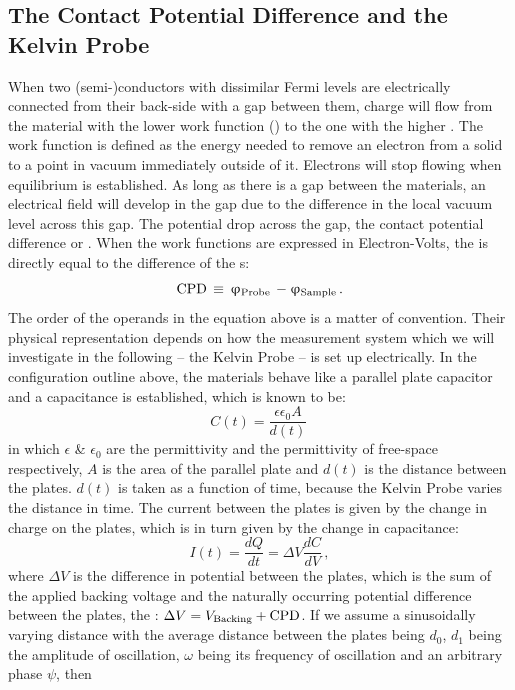 \subsection{The Contact Potential Difference and the Kelvin Probe}
When two (semi-)conductors with dissimilar Fermi levels are electrically connected from their back-side with a gap between them, charge will flow from the material with the lower work function (\wf{}) to the one with the higher \wf{}. The work function is defined as the energy needed to remove an electron from a solid to a point in vacuum immediately outside of it. Electrons will stop flowing when equilibrium is established. As long as there is a gap between the materials, an electrical field will develop in the gap due to the difference in the local vacuum level across this gap. 
The potential drop across the gap, the contact potential difference or \cpd{}. When the work functions are expressed in Electron-Volts, the \cpd{} is directly equal to the difference of the \wf{}s:
\begin{equation}
\label{wf}
	{\text{CPD}} \, \equiv \,  \upvarphi _{\text{Probe}} \, - \upvarphi _{\text{Sample}} \, .
\end{equation}
The order of the operands in the equation above is a matter of convention. Their physical representation depends on how the measurement system which we will investigate in the following -- the Kelvin Probe -- is set up electrically. 
In the configuration outline above, the materials behave like a parallel plate capacitor and a capacitance is established, which is known to be:
\begin{equation}
\label{cap}
	C(t) = \frac{\epsilon \epsilon_0 A}{d(t)} \,
\end{equation}  
in which $\epsilon$ \& $\epsilon_0$ are the permittivity and the permittivity of free-space respectively, $A$ is the area of the parallel plate and $d(t)$ is the distance between the plates. $d(t)$ is taken as a function of time, because the Kelvin Probe varies the distance in time. The current between the plates is given by the change in charge on the plates, which is in turn given by the change in capacitance:
\begin{equation}
	I(t) = \frac{dQ}{dt}= \Delta V \frac{dC}{dV} \, ,
\end{equation}
where $\Delta V$ is the difference in potential between the plates, which is the sum of the applied backing voltage and the naturally occurring potential difference between the plates, the \cpd{}: $\Delta V = V_{\text{Backing}} + \text{CPD}$. If we assume a sinusoidally varying distance with the average distance between the plates being $d_0$, $d_1$ being the amplitude of oscillation, $\omega$ being its frequency of oscillation and an arbitrary phase $\psi$, then
